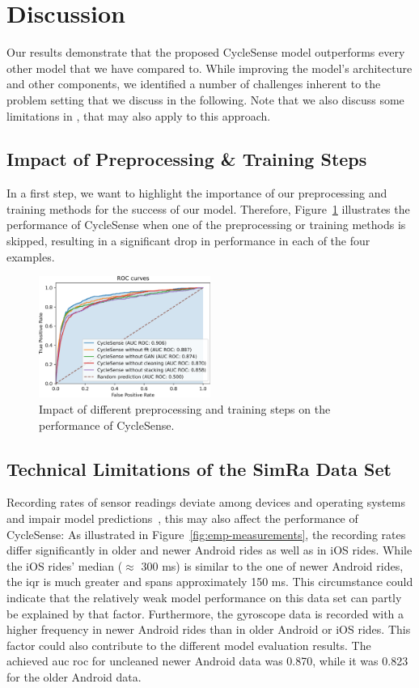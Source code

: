 \section{Discussion}
\label{sec:discussion_cyclesense}
Our results demonstrate that the proposed CycleSense model outperforms every other model that we have compared to.
While improving the model's architecture and other components, we identified a number of challenges inherent to the problem setting that we discuss in the following.
Note that we also discuss some limitations in , that may also apply to this approach.


\subsection{Impact of Preprocessing \& Training Steps}
\label{subsec:impact_of_preprocessing_and_training_steps}
In a first step, we want to highlight the importance of our preprocessing and training methods for the success of our model.
Therefore, Figure~\ref{fig:impact} illustrates the performance of CycleSense when one of the preprocessing or training methods is skipped, resulting in a significant drop in performance in each of the four examples.

\begin{figure}[t]
	\centering
	\includegraphics[width=0.5\textwidth]{fig/impact.png}
	\caption{Impact of different preprocessing and training steps on the performance of CycleSense.}
	\label{fig:impact}
\end{figure}

\subsection{Technical Limitations of the SimRa Data Set}
\label{subsec:technical_limitations_of_the_simra_data_set}
Recording rates of sensor readings deviate among devices and operating systems and impair model predictions~\cite{stisen2015smart}, this may also affect the performance of CycleSense:
As illustrated in Figure~\ref{fig:emp-measurements}, the recording rates differ significantly in older and newer Android rides as well as in iOS rides.
While the iOS rides' median ($\approx$ 300 ms) is similar to the one of newer Android rides, the \ac{iqr} is much greater and spans approximately 150 ms.
This circumstance could indicate that the relatively weak model performance on this data set can partly be explained by that factor. 
Furthermore, the gyroscope data is recorded with a higher frequency in newer Android rides than in older Android or iOS rides.
This factor could also contribute to the different model evaluation results. 
The achieved \ac{auc} \ac{roc} for uncleaned newer Android data was 0.870, while it was 0.823 for the older Android data.

